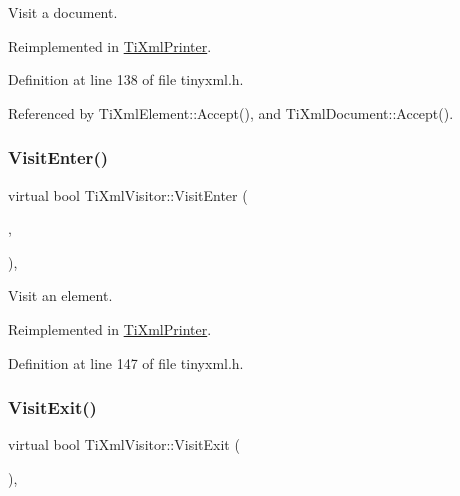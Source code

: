 Visit a document. 



Reimplemented in \hyperlink{class_ti_xml_printer_a2ec73087db26ff4d2c4316c56f861db7}{Ti\+Xml\+Printer}.



Definition at line 138 of file tinyxml.\+h.



Referenced by Ti\+Xml\+Element\+::\+Accept(), and Ti\+Xml\+Document\+::\+Accept().

\hypertarget{class_ti_xml_visitor_af6c6178ffa517bbdba95d70490875fff}{}\label{class_ti_xml_visitor_af6c6178ffa517bbdba95d70490875fff} 
\subsubsection{\texorpdfstring{Visit\+Enter()}{VisitEnter()}\hspace{0.1cm}{\footnotesize\ttfamily [2/2]}}
{\footnotesize\ttfamily virtual bool Ti\+Xml\+Visitor\+::\+Visit\+Enter (\begin{DoxyParamCaption}\item[{const \hyperlink{class_ti_xml_element}{Ti\+Xml\+Element} \&}]{,  }\item[{const \hyperlink{class_ti_xml_attribute}{Ti\+Xml\+Attribute} $\ast$}]{ }\end{DoxyParamCaption})\hspace{0.3cm}{\ttfamily [inline]}, {\ttfamily [virtual]}}



Visit an element. 



Reimplemented in \hyperlink{class_ti_xml_printer_a6dccaf5ee4979f13877690afe28721e8}{Ti\+Xml\+Printer}.



Definition at line 147 of file tinyxml.\+h.

\hypertarget{class_ti_xml_visitor_aa0ade4f27087447e93974e975c3246ad}{}\label{class_ti_xml_visitor_aa0ade4f27087447e93974e975c3246ad} 
\subsubsection{\texorpdfstring{Visit\+Exit()}{VisitExit()}\hspace{0.1cm}{\footnotesize\ttfamily [1/2]}}
{\footnotesize\ttfamily virtual bool Ti\+Xml\+Visitor\+::\+Visit\+Exit (\begin{DoxyParamCaption}\item[{const \hyperlink{class_ti_xml_document}{Ti\+Xml\+Document} \&}]{ }\end{DoxyParamCaption})\hspace{0.3cm}{\ttfamily [inline]}, {\ttfamily [virtual]}}



